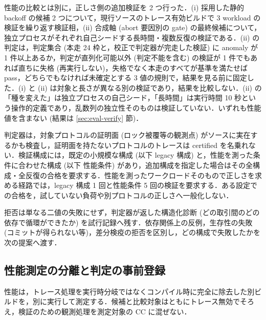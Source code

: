 \documentclass[submit,techrep,noauthor]{ipsj}
\begin{document}
性能の比較とは別に，正しさ側の追加検証を 2 つ行った．(i) 採用した静的 backoff の候補 2 つについて，現行ソースのトレース有効ビルドで 3 workload の検証を繰り返す検証相，(ii) 合成軸 (abort 要因別の gate) の最終候補について，独立プロセスがそれぞれ自己シードする長時間・複数反復の検証である．(ii) の判定は，判定集合 (本走 24 枠と，校正で判定器が完走した検証) に anomaly が 1 件以上あるか，判定が直列化可能以外 (判定不能を含む) の検証が 1 件でもあれば直ちに失格 (再実行しない)，失格でなく本走のすべてが基準を満たせば pass，どちらでもなければ未確定とする 3 値の規則で，結果を見る前に固定した．(i) と (ii) は対象と長さが異なる別の検証であり，結果を比較しない．(ii) の「種を変えた」は独立プロセスの自己シード，「長時間」は実行時間 10 秒という操作的定義であり，乱数列の独立性そのものは検証していない．いずれも性能値を含まない (結果は \ref{sec:eval-verify} 節)．

判定器は，対象プロトコルの証明面 (ロック被覆等の観測点) がソースに実在するかも検査し，証明面を持たないプロトコルのトレースは certified を名乗れない．検証構成には，既定の小規模な構成 (以下 legacy 構成) と，性能を測った条件に合わせた構成 (以下 性能条件) があり，追加構成を指定した場合はその全構成・全反復の合格を要求する．性能を測ったワークロードそのもので正しさを求める経路では，legacy 構成 1 回と性能条件 5 回の検証を要求する．ある設定での合格を，試していない負荷や別プロトコルの正しさへ一般化しない．

拒否は単なる二値の失敗にせず，判定器が返した構造化診断 (どの取引間のどの依存で循環ができたか) を試行記録へ残す．依存関係上の反例，生存性の失敗 (コミットが得られない等)，差分検疫の拒否を区別し，どの構成で失敗したかを次の提案へ渡す．

\subsection{性能測定の分離と判定の事前登録}
\label{sec:design-perf}

性能は，トレース処理を実行時分岐ではなくコンパイル時に完全に除去した別ビルドを，別に実行して測定する．候補と比較対象はともにトレース無効でそろえ，検証のための観測処理を測定対象の CC に混ぜない．
\end{document}
